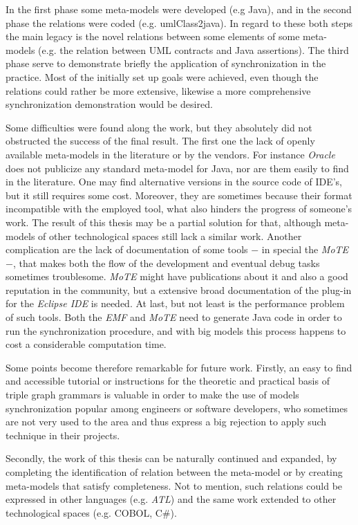 \documentclass[tuberlin,cic,tc,english,noabntcite]{iiufrgs}
\begin{document}
In the first phase some meta-models were developed (e.g Java), and in the second phase the relations were coded (e.g. umlClass2java). In regard to these both steps the main legacy is the novel relations between some elements of some meta-models (e.g. the relation between UML contracts and Java assertions). The third phase serve to demonstrate briefly the application of synchronization in the practice. Most of the initially set up goals were achieved, even though the relations could rather be more extensive, likewise a more comprehensive synchronization demonstration would be desired.


Some difficulties were found along the work, but they absolutely did not obstructed the success of the final result. The first one the lack of openly available meta-models in the literature or by the vendors. For instance \emph{Oracle} does not publicize any standard meta-model for Java, nor are them easily to find in the literature. One may find alternative versions in the source code of IDE's, but it still requires some cost. Moreover, they are sometimes because their format incompatible with the employed tool, what also hinders the progress of someone's work. The result of this thesis may be a partial solution for that, although meta-models of other technological spaces still lack a similar work. Another complication are the lack of documentation of some tools $-$ in special the \emph{MoTE} $-$, that makes both the flow of the development and eventual debug tasks sometimes troublesome. \emph{MoTE} might have publications about it and also a good reputation in the community, but a extensive broad documentation of the plug-in for the \emph{Eclipse IDE} is needed. At last, but not least is the performance problem of such tools. Both the \emph{EMF} and \emph{MoTE} need to generate Java code in order to run the synchronization procedure, and with big models this process happens to cost a considerable computation time.

Some points become therefore remarkable for future work. Firstly, an easy to find and accessible tutorial or instructions for the theoretic and practical basis of triple graph grammars is valuable in order to make the use of models synchronization popular among engineers or software developers, who sometimes are not very used to the area and thus express a big rejection to apply such technique in their projects.

Secondly, the work of this thesis can be naturally continued and expanded, by completing the identification of relation between the meta-model or by creating meta-models that satisfy completeness. Not to mention, such relations could be expressed in other languages (e.g. \emph{ATL}) and the same work extended to other technological spaces (e.g. COBOL, C\#).
\end{document}
